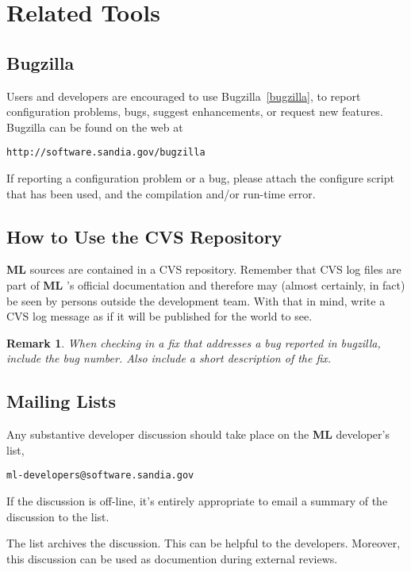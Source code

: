\documentclass[10pt,letter,relax]{SANDreport}
\newtheorem{remark}{Remark}
\newcommand{\ML}     {{\bf ML }}
\begin{document}

\section{Related Tools}
\label{sec:tools}

\subsection{Bugzilla}

Users and developers are encouraged to use Bugzilla~\ref{bugzilla}, to
report configuration problems, bugs, suggest enhancements, or request
new features. Bugzilla can be found on the web at 
\begin{verbatim}
http://software.sandia.gov/bugzilla
\end{verbatim}
If reporting a configuration problem or a bug, please attach the
configure script that has been used, and the compilation and/or run-time
error.

\subsection{How to Use the CVS Repository}

\ML sources are contained in a CVS repository. 
Remember that CVS log files are part of \ML's official
  documentation and therefore may (almost certainly, in fact) be seen by
  persons outside the development team.  With that in mind, write a CVS
  log message as if it will be published for the world to see.

\begin{remark}
  When checking in a fix that addresses a bug reported in bugzilla,
  include the bug number.  Also include a short description of the fix.
\end{remark}

\subsection{Mailing Lists}

Any substantive developer discussion should take place on the \ML
developer's list, 
\begin{verbatim}
ml-developers@software.sandia.gov
\end{verbatim}
If the discussion is off-line, it's entirely appropriate to email a
summary of the discussion to the list.

The list archives the discussion.  This can be helpful to the
developers.  Moreover, this discussion can be used as documention during
external reviews.
\end{document}
